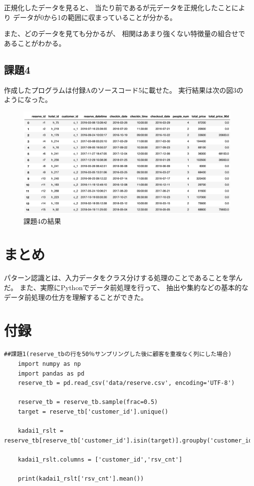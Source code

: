 \documentclass[12pt]{jarticle}
\begin{document}
正規化したデータを見ると、
当たり前であるが元データを正規化したことにより
データが0から1の範囲に収まっていることが分かる。

また、どのデータを見ても分かるが、
相関はあまり強くない特徴量の組合せであることがわかる。

\subsection{課題4}
作成したプログラムは付録Aのソースコード5に載せた。
実行結果は次の図3のようになった。
\begin{figure}[h]
    \begin{center}
        \includegraphics[scale=0.25]{kadai2_1_3.png}
    \end{center}
    \caption{課題4の結果}
\end{figure}

\clearpage
\section{まとめ}
パターン認識とは、入力データをクラス分けする処理のことであることを学んだ。
また、実際にPythonでデータ前処理を行って、
抽出や集約などの基本的なデータ前処理の仕方を理解することができた。
\clearpage
\appendix
\section{付録}

\begin{lstlisting}[style = py,caption=課題1(1)]
    ##課題1(reserve_tbの行を50％サンプリングした後に顧客を重複なく列にした場合)
    import numpy as np
    import pandas as pd
    reserve_tb = pd.read_csv('data/reserve.csv', encoding='UTF-8')
    
    reserve_tb = reserve_tb.sample(frac=0.5)
    target = reserve_tb['customer_id'].unique()
    
    kadai1_rslt = reserve_tb[reserve_tb['customer_id'].isin(target)].groupby('customer_id').size().reset_index()
    
    kadai1_rslt.columns = ['customer_id','rsv_cnt']
    
    print(kadai1_rslt['rsv_cnt'].mean())
\end{lstlisting}
\end{document}
